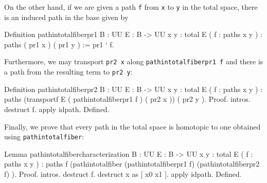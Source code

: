 On the other hand, if we are given a path \verb|f| from
\verb|x| to \verb|y| in the total space, there is an induced
path in the base given by 
\begin{center}
  \begin{coqcode}
Definition pathintotalfiberpr1 { B : UU } { E : B -> UU } { x y : total E } ( f : paths x y ) : paths ( pr1 x ) ( pr1 y ) := pr1 ` f.
  \end{coqcode}
\end{center}
Furthermore, we may transport \verb|pr2 x| along
\verb|pathintotalfiberpr1 f| and there is a path from the
resulting term to \verb|pr2 y|:
\begin{center}
  \begin{coqcode}
Definition pathintotalfiberpr2 { B : UU } { E : B -> UU } { x y : total E } ( f : paths x y ) : paths (transportf E ( pathintotalfiberpr1 f ) ( pr2 x )) ( pr2 y ).
Proof.
  intros. destruct f. apply idpath.
Defined.
  \end{coqcode}
\end{center}
Finally, we prove that every path in the total space is homotopic to
one obtained using \verb|pathintotalfiber|:
\begin{center}
  \begin{coqcode}
Lemma pathintotalfibercharacterization { B : UU } { E : B -> UU } { x
  y : total E } ( f : paths x y ) : paths f  (pathintotalfiber (pathintotalfiberpr1 f) (pathintotalfiberpr2 f) ).
Proof.
  intros. destruct f. destruct x as [ x0 x1 ]. apply idpath.
Defined.
  \end{coqcode}
\end{center}
